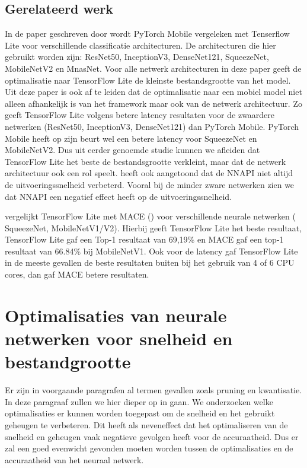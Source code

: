 \subsection{Gerelateerd werk}
In de paper geschreven door \cite{luo_comparison_2020} wordt PyTorch Mobile vergeleken met Tenserflow Lite voor verschillende classificatie architecturen.
De architecturen die hier gebruikt worden zijn: ResNet50, InceptionV3, DenseNet121, SqueezeNet, MobileNetV2 en MnasNet.
Voor alle netwerk architecturen in deze paper geeft de optimalisatie naar TensorFlow Lite de kleinste bestandsgrootte van het model. 
Uit deze paper is ook af te leiden dat de optimalisatie naar een mobiel model niet alleen afhankelijk is van het framework maar ook van de netwerk architectuur.
Zo geeft TensorFlow Lite volgens \cite{luo_comparison_2020} betere latency resultaten voor de zwaardere netwerken (ResNet50, InceptionV3, DenseNet121) dan PyTorch Mobile.
PyTorch Mobile heeft op zijn beurt wel een betere latency voor SqueezeNet en MobileNetV2.
Dus uit eerder genoemde studie kunnen we afleiden dat TensorFlow Lite het beste de bestandsgrootte verkleint, maar dat de netwerk architectuur ook een rol speelt.
\cite{luo_comparison_2020} heeft ook aangetoond dat de NNAPI niet altijd de uitvoeringssnelheid verbeterd.
Vooral bij de minder zware netwerken zien we dat NNAPI een negatief effect heeft op de uitvoeringssnelheid.


\cite{febvay_low-level_2020} vergelijkt TensorFlow Lite met MACE (\cite{khan_mace_2020}) voor verschillende neurale netwerken ( SqueezeNet, MobileNetV1/V2).
Hierbij geeft TensorFlow Lite het beste resultaat, TensorFlow Lite gaf een Top-1 resultaat van 69,19\% en MACE gaf een top-1 resultaat van 66.84\% bij MobileNetV1.
Ook voor de latency gaf TensorFlow Lite in de meeste gevallen de beste resultaten buiten bij het gebruik van 4 of 6 CPU cores, dan gaf MACE betere resultaten.  

\section{Optimalisaties van neurale netwerken voor snelheid en bestandgrootte} \label{optim}
Er zijn in voorgaande paragrafen al termen gevallen zoals pruning en kwantisatie.
In deze paragraaf zullen we hier dieper op in gaan.
We onderzoeken welke optimalisaties er kunnen worden toegepast om de snelheid en het gebruikt geheugen te verbeteren.
Dit heeft als neveneffect dat het optimaliseren van de snelheid en geheugen vaak negatieve gevolgen heeft voor de accuraatheid.
Dus er zal een goed evenwicht gevonden moeten worden tussen de optimalisaties en de accuraatheid van het neuraal netwerk.

